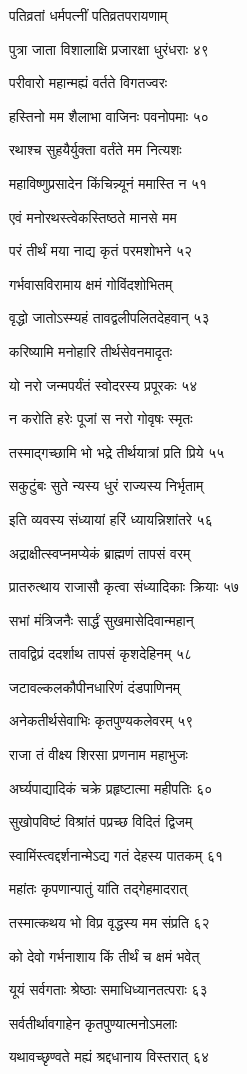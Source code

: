 पतिव्रतां धर्मपत्नीं पतिव्रतपरायणाम्

पुत्रा जाता विशालाक्षि प्रजारक्षा धुरंधराः ४९

परीवारो महान्मह्यं वर्तते विगतज्वरः

हस्तिनो मम शैलाभा वाजिनः पवनोपमाः ५०

रथाश्च सुहयैर्युक्ता वर्तंते मम नित्यशः

महाविष्णुप्रसादेन किंचिन्न्यूनं ममास्ति न ५१

एवं मनोरथस्त्वेकस्तिष्ठते मानसे मम

परं तीर्थं मया नाद्य कृतं परमशोभने ५२

गर्भवासविरामाय क्षमं गोविंदशोभितम्

वृद्धो जातोऽस्म्यहं तावद्वलीपलितदेहवान् ५३

करिष्यामि मनोहारि तीर्थसेवनमादृतः

यो नरो जन्मपर्यंतं स्वोदरस्य प्रपूरकः ५४

न करोति हरेः पूजां स नरो गोवृषः स्मृतः

तस्माद्गच्छामि भो भद्रे तीर्थयात्रां प्रति प्रिये ५५

सकुटुंबः सुते न्यस्य धुरं राज्यस्य निर्भृताम्

इति व्यवस्य संध्यायां हरिं ध्यायन्निशांतरे ५६

अद्राक्षीत्स्वप्नमप्येकं ब्राह्मणं तापसं वरम्

प्रातरुत्थाय राजासौ कृत्वा संध्यादिकाः क्रियाः ५७

सभां मंत्रिजनैः सार्द्धं सुखमासेदिवान्महान्

तावद्विप्रं ददर्शाथ तापसं कृशदेहिनम् ५८

जटावल्कलकौपीनधारिणं दंडपाणिनम्

अनेकतीर्थसेवाभिः कृतपुण्यकलेवरम् ५९

राजा तं वीक्ष्य शिरसा प्रणनाम महाभुजः

अर्घ्यपाद्यादिकं चक्रे प्रहृष्टात्मा महीपतिः ६०

सुखोपविष्टं विश्रांतं पप्रच्छ विदितं द्विजम्

स्वामिंस्त्वद्दर्शनान्मेऽद्य गतं देहस्य पातकम् ६१

महांतः कृपणान्पातुं यांति तद्गेहमादरात्

तस्मात्कथय भो विप्र वृद्धस्य मम संप्रति ६२

को देवो गर्भनाशाय किं तीर्थं च क्षमं भवेत्

यूयं सर्वगताः श्रेष्ठाः समाधिध्यानतत्पराः ६३

सर्वतीर्थावगाहेन कृतपुण्यात्मनोऽमलाः

यथावच्छृण्वते मह्यं श्रद्दधानाय विस्तरात् ६४

